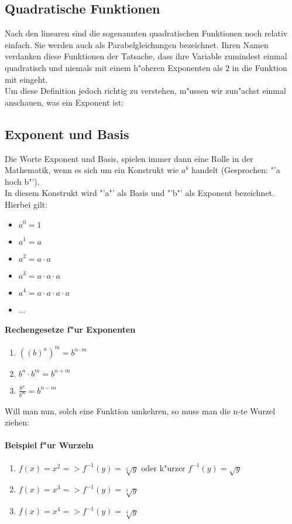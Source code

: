\subsection{Quadratische Funktionen}
Nach den linearen sind die sogenannten quadratischen Funktionen noch relativ einfach. Sie werden auch als Parabelgleichungen bezeichnet. Ihren Namen verdanken diese Funktionen der Tatsache, dass ihre Variable zumindest einmal quadratisch und niemals mit einem h"oheren Exponenten als $2$ in die Funktion mit eingeht.\\
Um diese Definition jedoch richtig zu verstehen, m"ussen wir zun"achst einmal anschauen, was ein Exponent ist:

\subsection{Exponent und Basis}
Die Worte Exponent und Basis, spielen immer dann eine Rolle in der Mathematik, wenn es sich um ein Konstrukt wie $a^b$ handelt (Gesprochen: "'a hoch b"').\\
In diesem Konstrukt wird "'a"' als Basis und "'b"' als Exponent bezeichnet. Hierbei gilt:
\begin{itemize}
	\item $a^0 = 1$
	\item $a^1 = a$
	\item $a^2 = a \cdot a$
	\item $a^3 = a \cdot a \cdot a$
	\item $a^4 = a \cdot a \cdot a \cdot a$
	\item $\ldots$
\end{itemize}

\paragraph{Rechengesetze f"ur Exponenten}
\begin{enumerate}
	\item $((b)^n)^m = b^{n \cdot m}$
	\item $b^n \cdot b^m = b^{n+m}$
	\item $\frac{b^n}{b^m} = b^{n-m}$
\end{enumerate}

\noindent Will man nun, solch eine Funktion umkehren, so muss man die n-te Wurzel ziehen:
\paragraph{Beispiel f"ur Wurzeln}
\begin{enumerate}
	\item $f(x)=x^2 => f^{-1}(y)=\sqrt[2]{y}$ oder k"urzer $f^{-1}(y)=\sqrt{y}$
	\item $f(x)=x^3 => f^{-1}(y)=\sqrt[3]{y}$
	\item $f(x)=x^4 => f^{-1}(y)=\sqrt[4]{y}$
\end{enumerate}

